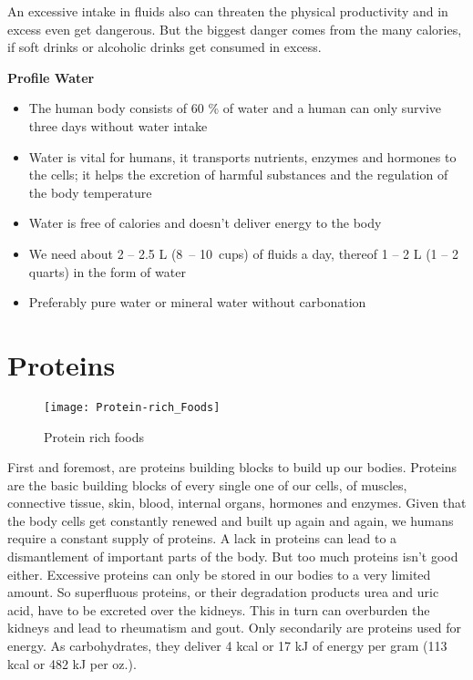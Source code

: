 \documentclass[../main.tex]{subfiles}
\begin{document}
    An excessive intake in fluids also can threaten the physical productivity and in excess even get dangerous.
    But the biggest danger comes from the many calories, if soft drinks or alcoholic drinks get consumed in excess. 

 
\vspace{5mm}
\noindent
\begin{fminipage}{\textwidth}
  \textbf{Profile Water}
  \begin{itemize}
  \item The human body consists of 60 \% of water and a human can only survive three days without water intake
  \item Water is vital for humans, it transports nutrients, enzymes and hormones to the cells; it helps the excretion of harmful substances and the regulation of the body temperature
  \item Water is free of calories and doesn't deliver energy to the body
  \item We need about 2 -- 2.5 L (8\ -- 10\ cups) of fluids a day, thereof 1 -- 2 L (1 -- 2 quarts) in the form of water
    \item Preferably pure water or mineral water without carbonation
  \end{itemize}
\end{fminipage}

\section{Proteins}

\begin{figure}[htb!]
\centering
  \texttt{[image: Protein-rich\_Foods]}
  \caption{Protein rich foods\cite{Proteins}}
\end{figure}

First and foremost, are proteins building blocks to build up our bodies.
Proteins are the basic building blocks of every single one of our cells, of muscles, connective tissue, skin,
blood, internal organs, hormones and enzymes.
Given that the body cells get constantly renewed and built up again and again, we humans require a constant supply of proteins.
A lack in proteins can lead to a dismantlement of important parts of the body.
But too much proteins isn't good either.
Excessive proteins can only be stored in our bodies to a very limited amount.
So superfluous proteins, or their degradation products urea and uric acid, have to be excreted over the kidneys.
This in turn can overburden the kidneys and lead to rheumatism and gout.
Only secondarily are proteins used for energy.
As carbohydrates, they deliver 4 kcal or 17 kJ of energy per gram (113 kcal or 482 kJ per oz.).
\end{document}
